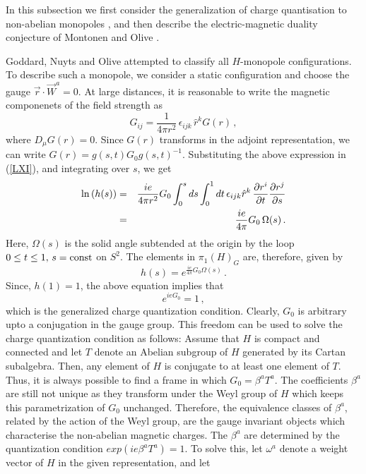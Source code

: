 In this subsection we first consider the generalization of charge
quantisation to non-abelian monopoles \cite{GNO}, and then describe
the electric-magnetic duality conjecture of Montonen and Olive 
\cite{MO}.

Goddard, Nuyts and Olive \cite{GNO} attempted to classify all
$H$-monopole configurations. To describe such a monopole, we consider
a static configuration and choose the gauge $\vec{r}\cdot\vec{W}^a =0$.
At large distances, it is reasonable to write the magnetic componenets
of the field strength as
$$
G_{ij} = \frac{1}{4 \pi r^2} \, \epsilon_{ijk} \, \hat{r}^k G(r)\,, 
$$
where $D_\mu G(r)=0$. Since $G(r)$ transforms in the adjoint
representation, we can write $G(r)=g(s,t)G_{0}g(s,t)^{-1}$. 
Substituting the above expression in (\ref{LXI}), and integrating over
$s$, we get
\begin{eqnarray}
{\rm ln}\left(h(s)\right) & = & \frac{ie}{4\pi r^2} G_0  
\int^s_0 ds\int^1_0 dt\,\epsilon_{ijk}\hat{r}^k \,
\frac{\partial r^i}{\partial t}\frac{\partial r^j}{\partial s}
\nonumber \\
& = & \frac{ie}{4\pi} G_0\,\Omega (s)\,.
\label{LXX}
\end{eqnarray}
Here, $\Omega (s)$ is the solid angle subtended at the origin by the
loop $0\leq t\leq 1,\,s={\rm const}$ on $S^2$. The elements in
$\pi_1(H)_G$ are, therefore, given by  
$$
h(s)= e^{\frac{ie}{4 \pi} G_0\Omega(s)}\,. 
$$
Since, $h(1)=1$, the above equation implies that
\begin{equation}
e^{ie G_0} = 1\,,
\label{LXXI} 
\end{equation}
which is the generalized charge quantization condition.
Clearly, $G_0$ is arbitrary upto a conjugation in the gauge
group. This freedom can be used to solve the charge quantization
condition as follows: Assume that $H$ is compact and connected and let
$T$ denote an Abelian subgroup of $H$ generated by its Cartan
subalgebra. Then, any element of $H$ is conjugate to at least one
element of $T$. Thus, it is always possible to find a frame in which
$G_0 = \beta^a T^a$. The coefficients $\beta^a$ are still not unique
as they transform under the Weyl group of $H$ which keeps this
parametrization of $G_0$ unchanged. Therefore, the equivalence classes
of $\beta^a$, related by the action of the Weyl group, are the gauge
invariant objects which characterise the non-abelian magnetic
charges. The $\beta^a$ are determined by the quantization
condition $exp(ie \beta^a T^a)=1$. To solve this, let $\omega^a$
denote a weight vector of $H$ in the given representation, and let
